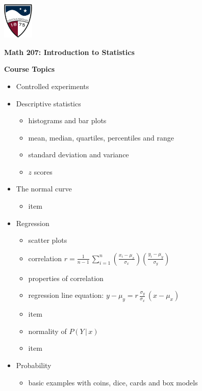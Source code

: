 \documentclass[10pt]{article}
\begin{document}
\pagestyle{plain}
\setlength{\baselineskip}{1.05\baselineskip}
\href{http://www.su.edu}{\includegraphics[height=1.75cm]{sulogo.eps}}
\vspace{-1.69cm}

\begin{center}
  \textbf{\large Math 207: Introduction to Statistics}
\medskip

\textbf{Course Topics}
\bigskip\bigskip
\end{center}

\begin{itemize}
\item Controlled experiments
\item Descriptive statistics
  \begin{itemize}
  \item histograms and bar plots
  \item mean, median, quartiles, percentiles and range
  \item standard deviation and variance
  \item $z$ scores
  \end{itemize}
\item The normal curve
  \begin{itemize}
  \item item
  \end{itemize}
\item Regression
  \begin{itemize}
  \item scatter plots 
  \item correlation $r=\frac{1}{n-1}\,\sum_{i=1}^n\left(\frac{x_i-\mu_x}{\sigma_x}\right)\left(\frac{y_i-\mu_y}{\sigma_y}\right)$
  \item properties of correlation
  \item regression line equation:  $y-\mu_y = r\,\frac{\sigma_y}{\sigma_x}\,(x-\mu_x)$
  \item item
  \item normality of $P(Y\,\vert\,x)$
  \item item
  \end{itemize}
\item Probability
  \begin{itemize}
  \item basic examples with coins, dice, cards and box models

\end{itemize}
\end{itemize}
\end{document}
